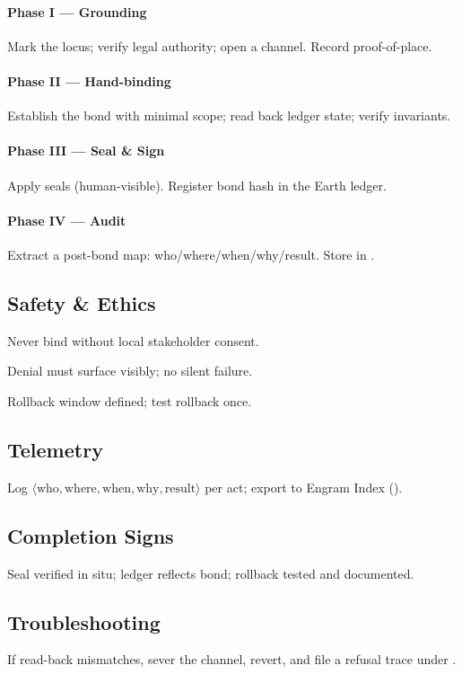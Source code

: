 \paragraph{Phase I — Grounding}
Mark the locus; verify legal authority; open a  channel. Record proof-of-place.
\paragraph{Phase II — Hand-binding}
Establish the bond with minimal scope; read back ledger state; verify invariants.
\paragraph{Phase III — Seal \& Sign}
Apply seals (human-visible). Register bond hash in the Earth ledger.
\paragraph{Phase IV — Audit}
Extract a post-bond map: who/where/when/why/result. Store in .

\subsection*{Safety \& Ethics}
\begin{tightitemize}
  \item Never bind without local stakeholder consent.
  \item Denial must surface visibly; no silent failure.
  \item Rollback window defined; test rollback once.
\end{tightitemize}

\subsection*{Telemetry}
Log \(\langle \text{who},\text{where},\text{when},\text{why},\text{result}\rangle\) per act; export to Engram Index ().

\subsection*{Completion Signs}
Seal verified in situ; ledger reflects bond; rollback tested and documented.

\subsection*{Troubleshooting}
If read-back mismatches, sever the channel, revert, and file a refusal trace under .


